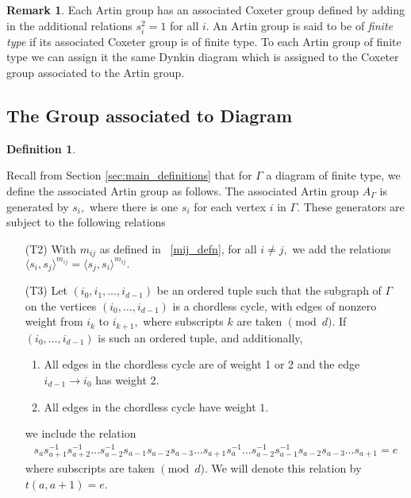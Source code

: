 \documentclass[11pt]{amsart}
\theoremstyle{definition}
\newtheorem{defn}[thm]{Definition}
\newtheorem{rem}[thm]{Remark}
\begin{document}
\begin{rem}
Each Artin group has an associated Coxeter group defined by adding in the additional relations $s_i^2 = 1$ for all $i.$ An Artin group is said to be of {\it finite type} if its associated Coxeter group is of finite type. To each Artin group of finite type we can assign it the same Dynkin diagram which is assigned to the Coxeter group associated to the Artin group.
\end{rem}

\subsection{The Group associated to Diagram}


\begin{defn} \label{grp def}

Recall from Section \ref{sec:main_definitions} that for $\Gamma$ a diagram of finite type, we define the associated Artin group as follows. The associated Artin group $A_\Gamma$ is generated by $s_i,$ where there is one $s_i$ for each vertex $i$ in $\Gamma.$ These generators are subject to the following relations
\begin{itemize}
\item[(T2)] With $m_{ij}$ as defined in ~\ref{mij_defn}, for all $i \neq j,$ we add the relations
$\langle s_i,s_j \rangle^{m_{ij}}= \langle s_j,s_i \rangle^{m_{ij}}.$

\item[(T3)] Let $(i_0,i_1,\ldots,i_{d-1})$ be an ordered tuple such that the subgraph of $\Gamma$ on the vertices $(i_0,\ldots, i_{d-1})$ is a chordless cycle, with edges of nonzero weight from $i_k$ to $i_{k+1},$ where subscripts $k$ are taken $\pmod d.$ If $(i_0,\ldots, i_{d-1})$ is such an ordered tuple, and additionally,
\begin{enumerate}
\item All edges in the chordless cycle are of weight 1 or 2 and the edge $i_{d-1}\rightarrow i_0$ has weight 2.
\item All edges in the chordless cycle have weight $1.$
\end{enumerate}
we include the relation
\begin{align*}
s_{a}s_{a+1}^{-1}s_{a+2}^{-1}\dots s_{a-2}^{-1}s_{a-1}s_{a-2}s_{a-3}\dots s_{a+1} s_{a}^{-1}\dots s_{a-2}^{-1}s_{a-1}^{-1}s_{a-2}s_{a-3} \dots s_{a+1} = e
\end{align*}
where subscripts are taken $\pmod d.$ We will denote this relation by $t(a,a+1) = e$.
\end{itemize}
\end{defn}
\end{document}
